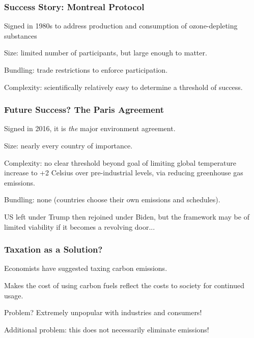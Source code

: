 \documentclass[handout]{beamer}
\begin{document}
\begin{frame} 
	\frametitle{\LARGE{Success Story: Montreal Protocol}}
	\begin{itemize}
		\large{
			\item Signed in 1980s to address production and consumption of ozone-depleting substances \pause
			
			\item Size: limited number of participants, but large enough to matter. \pause
			
			\item Bundling: trade restrictions to enforce participation. \pause
			
			\item Complexity: scientifically relatively easy to determine a threshold of success.
		}
	\end{itemize}
\end{frame}

\begin{frame} 
	\frametitle{\LARGE{Future Success? The Paris Agreement}}
	\begin{itemize}
		\large{
			\item Signed in 2016, it is \textit{the} major environment agreement. \pause
			
			\item Size: nearly every country of importance. \pause
			
			\item Complexity: no clear threshold beyond goal of limiting global temperature increase to +2 Celsius over pre-industrial levels, via reducing greenhouse gas emissions. \pause 
			
			\item Bundling: none (countries choose their own emissions and schedules). \pause 
			
			\item US left under Trump then rejoined under Biden, but the framework may be of limited viability if it becomes a revolving door...
			
		}
	\end{itemize}
\end{frame}


\begin{frame} 
	\frametitle{\LARGE{Taxation as a Solution?}}
	\begin{itemize}
		\large{\pause
			\item Economists have suggested taxing carbon emissions. \pause
			
			\item Makes the cost of using carbon fuels reflect the costs to society for continued usage. \pause
			
			\item Problem? \pause Extremely unpopular with industries and consumers! \pause
			\item Additional problem: this does not necessarily eliminate emissions!
		}
	\end{itemize}
\end{frame}
\end{document}
